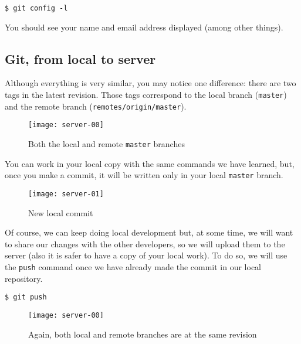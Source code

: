 \documentclass[a4paper,10pt]{article}
\newenvironment{terminal}
  {
    \vspace{+10pt}
    \begin{center}
    \begin{minipage}{0.95\textwidth}
    \begin{framed}
  }
  {
    \end{framed}
    \end{minipage}
    \end{center}
    \vspace{+10pt}
  }
\begin{document}
\begin{terminal}
\begin{verbatim}
$ git config -l
\end{verbatim}
\end{terminal}

You should see your name and email address displayed (among other
things).

\subsection{Git, from local to server}

Although everything is very similar, you may notice one difference:
there are two tags in the latest
revision. Those tags correspond to the local branch (\texttt{master})
and the remote
branch (\texttt{remotes/origin/master}).

\begin{figure}
  \begin{center}
    \texttt{[image: server-00]}
  \end{center}
  \caption{Both the local and remote \texttt{master} branches}
\end{figure}

You can work in your local copy with the same commands we have
learned, but, once you make a commit, it will be written only in your
local \texttt{master} branch.

\begin{figure}
  \begin{center}
    \texttt{[image: server-01]}
  \end{center}
  \caption{New local commit}
\end{figure}

Of course, we can keep doing local development but, at some time, we
will want to share our changes with the other developers, so we will
upload them to the server (also it is safer to have a copy of your
local work). To do so, we will use the \texttt{push} command once we have
already made the commit in our local repository.

\begin{terminal}
\begin{verbatim}
$ git push
\end{verbatim}
\end{terminal}

\begin{figure}
  \begin{center}
    \texttt{[image: server-00]}
  \end{center}
  \caption{Again, both local and remote branches are at the same revision}
\end{figure}
\end{document}
